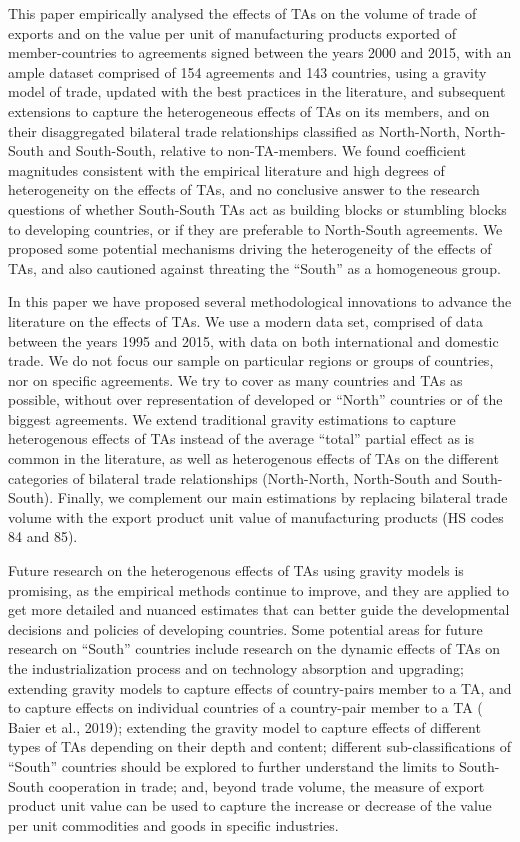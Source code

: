 This paper empirically analysed the effects of TAs on the volume of
trade of exports and on the value per unit of manufacturing products
exported of member-countries to agreements signed between the years 2000
and 2015, with an ample dataset comprised of 154 agreements and 143
countries, using a gravity model of trade, updated with the best
practices in the literature, and subsequent extensions to capture the
heterogeneous effects of TAs on its members, and on their disaggregated
bilateral trade relationships classified as North-North, North-South and
South-South, relative to non-TA-members. We found coefficient magnitudes
consistent with the empirical literature and high degrees of
heterogeneity on the effects of TAs, and no conclusive answer to the
research questions of whether South-South TAs act as building blocks or
stumbling blocks to developing countries, or if they are preferable to
North-South agreements. We proposed some potential mechanisms driving
the heterogeneity of the effects of TAs, and also cautioned against
threating the ``South'' as a homogeneous group.

In this paper we have proposed several methodological innovations to
advance the literature on the effects of TAs. We use a modern data set,
comprised of data between the years 1995 and 2015, with data on both
international and domestic trade. We do not focus our sample on
particular regions or groups of countries, nor on specific agreements.
We try to cover as many countries and TAs as possible, without over
representation of developed or ``North'' countries or of the biggest
agreements. We extend traditional gravity estimations to capture
heterogenous effects of TAs instead of the average ``total'' partial
effect as is common in the literature, as well as heterogenous effects
of TAs on the different categories of bilateral trade relationships
(North-North, North-South and South-South). Finally, we complement our
main estimations by replacing bilateral trade volume with the export
product unit value of manufacturing products (HS codes 84 and 85).

Future research on the heterogenous effects of TAs using gravity models
is promising, as the empirical methods continue to improve, and they are
applied to get more detailed and nuanced estimates that can better guide
the developmental decisions and policies of developing countries. Some
potential areas for future research on ``South'' countries include
research on the dynamic effects of TAs on the industrialization process
and on technology absorption and upgrading; extending gravity models to
capture effects of country-pairs member to a TA, and to capture effects
on individual countries of a country-pair member to a TA (\cite{baier_widely_2019} Baier et al.,
2019); extending the gravity model to capture effects of different types
of TAs depending on their depth and content; different
sub-classifications of ``South'' countries should be explored to further
understand the limits to South-South cooperation in trade; and, beyond
trade volume, the measure of export product unit value can be used to
capture the increase or decrease of the value per unit commodities and
goods in specific industries.
